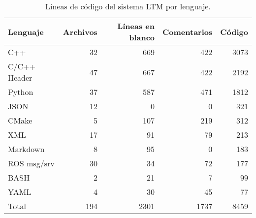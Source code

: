 \begin{table}[!ht]
	\centering
	\begin{tabular}{|l|r|r|r|r|}
		\hline
		\rowcolor{gray!50}
		Lenguaje & Archivos & Líneas en blanco & Comentarios & Código \\ \hline
		C++                   &  32  &  669  &  422  &  3073 \\ \hline
		C/C++ Header          &  47  &  667  &  422  &  2192 \\ \hline
		Python                &  37  &  587  &  471  &  1812 \\ \hline
		JSON                  &  12  &    0  &    0  &   321 \\ \hline
		CMake                 &   5  &  107  &  219  &   312 \\ \hline
		XML                   &  17  &   91  &   79  &   213 \\ \hline
		Markdown              &   8  &   95  &    0  &   183 \\ \hline
		ROS msg/srv           &  30  &   34  &   72  &   177 \\ \hline
		BASH    &   2  &   21  &    7  &    99 \\ \hline
		YAML                  &   4  &   30  &   45  &    77 \\ \hline
		\rowcolor{gray!50}
		Total                 & 194  & 2301  & 1737  & 8459  \\ \hline	
	\end{tabular} 
	\caption[Líneas de código del sistema LTM por lenguaje.]
	{\small Líneas de código del sistema LTM por lenguaje.}
	\label{table:lineas-codigo}
\end{table}


%
%
%

